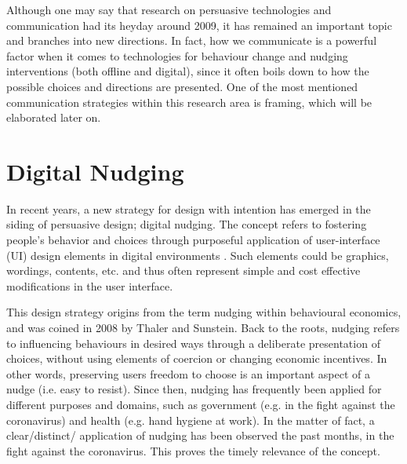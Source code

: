 
Although one may say that research on persuasive technologies and communication had its heyday around 2009, it has remained an important topic and  branches into new directions. In fact, how we communicate is a powerful factor when it comes to technologies for behaviour change and nudging interventions (both offline and digital), since it often boils down to how the possible choices and directions are presented. One of the most mentioned communication strategies within this research area is framing, which will be elaborated  later on.

\section{Digital Nudging}
In recent years, a new strategy for design with intention has emerged in the siding of persuasive design; digital nudging. The concept refers to fostering people's behavior and choices through purposeful application of user-interface (UI) design elements in digital environments \cite{mirsch_making_2018}. Such elements could be graphics, wordings, contents, etc. and thus often represent simple and cost effective modifications in the user interface.

This design strategy origins from the term nudging within behavioural economics, and was coined in 2008 by Thaler and Sunstein\cite{thaler_nudge-_2009}. 
Back to the roots, nudging refers to influencing behaviours in desired ways through a deliberate presentation of choices, without using elements of coercion or changing economic incentives. In other words, preserving users freedom to choose is an important aspect of a nudge (i.e. easy to resist). Since then, nudging has frequently been applied for different purposes and domains, such as government (e.g. in the fight against the coronavirus) and health (e.g. hand hygiene at work). In the matter of fact, a clear/distinct/ application of nudging has been observed the past months, in the fight against the coronavirus. This proves the timely relevance of the concept. 

